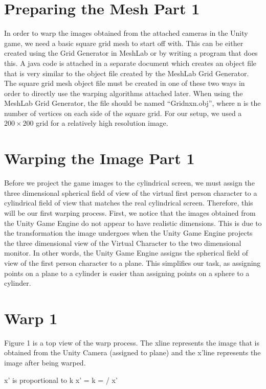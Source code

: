 \documentclass[a4paper]{article}
\begin{document}
\section{Preparing the Mesh Part 1}

In order to warp the images obtained from the attached cameras in the Unity game, we need a basic square grid mesh to start off with. This can be either created using the Grid Generator in MeshLab or by writing a program that does this. A java code is attached in a separate document which creates an object file that is very similar to the object file created by the MeshLab Grid Generator. The square grid mesh object file must be created in one of these two ways in order to directly use the warping algorithms attached later. When using the MeshLab Grid Generator, the file should be named “Gridnxn.obj”, where n is the number of vertices on each side of the square grid. For our setup, we used a $200 \times 200$ grid for a relatively high resolution image.

\section{Warping the Image Part 1}

Before we project the game images to the cylindrical screen, we must assign the three dimensional spherical field of view of the virtual first person character to a cylindrical field of view that matches the real cylindrical screen. Therefore, this will be our first warping process. First, we notice that the images obtained from the Unity Game Engine do not appear to have realistic dimensions. This is due to the transformation the image undergoes when the Unity Game Engine projects the three dimensional view of the Virtual Character to the two dimensional monitor. In other words, the Unity Game Engine assigns the spherical field of view of the first person character to a plane. This simplifies our task, as assigning points on a plane to a cylinder is easier than assigning points on a sphere to a cylinder. 

\section{Warp 1}

Figure 1 is a top view of the warp process. The xline represents the image that is obtained from the Unity Camera (assigned to plane) and the x'line represents the image after being warped. 

x' is proportional to 
k  x' =    
k =  / x' 
\end{document}

